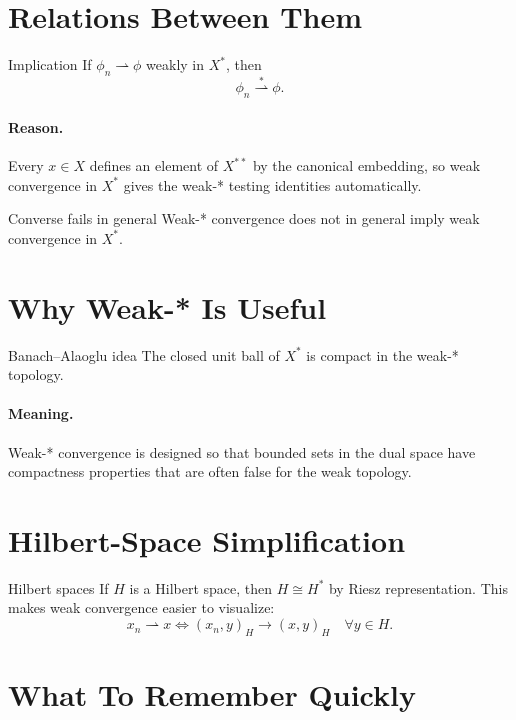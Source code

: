 \documentclass[header={Ancillary Note: Weak vs Weak-*},notheorems]{study-note}
\begin{document}
\section{Relations Between Them}

\begin{thmbox}{Implication}
If $\phi_n\rightharpoonup \phi$ weakly in $X^*$, then
\[
\phi_n \overset{*}{\rightharpoonup} \phi.
\]
\end{thmbox}

\paragraph{Reason.}
Every $x\in X$ defines an element of $X^{**}$ by the canonical embedding, so weak convergence in $X^*$ gives the weak-* testing identities automatically.

\begin{warningbox}{Converse fails in general}
Weak-* convergence does not in general imply weak convergence in $X^*$.
\end{warningbox}

\section{Why Weak-* Is Useful}

\begin{thmbox}{Banach--Alaoglu idea}
The closed unit ball of $X^*$ is compact in the weak-* topology.
\end{thmbox}

\paragraph{Meaning.}
Weak-* convergence is designed so that bounded sets in the dual space have compactness properties that are often false for the weak topology.

\section{Hilbert-Space Simplification}

\begin{exbox}{Hilbert spaces}
If $H$ is a Hilbert space, then $H\cong H^*$ by Riesz representation. This makes weak convergence easier to visualize:
\[
x_n\rightharpoonup x
\Longleftrightarrow
(x_n,y)_H\to (x,y)_H
\quad \forall y\in H.
\]
\end{exbox}

\section{What To Remember Quickly}
\end{document}

